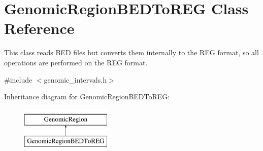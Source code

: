 \hypertarget{classGenomicRegionBEDToREG}{
\section{GenomicRegionBEDToREG Class Reference}
\label{classGenomicRegionBEDToREG}
}


This class reads BED files but converts them internally to the REG format, so all operations are performed on the REG format.  




{\ttfamily \#include $<$genomic\_\-intervals.h$>$}

Inheritance diagram for GenomicRegionBEDToREG:\begin{figure}[H]
\begin{center}
\leavevmode
\includegraphics[height=2.000000cm]{classGenomicRegionBEDToREG}
\end{center}
\end{figure}
